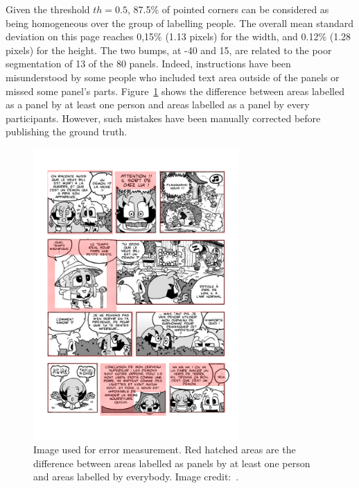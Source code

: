 Given the threshold $th=0.5$, 87.5\% of pointed corners can be considered as being homogeneous over the group of labelling people. 
The overall mean standard deviation on this page reaches 0,15\%
 (1.13 pixels) for the width, and 0.12\% (1.28 pixels) for the height.
The two bumps, at -40 and 15, are related to the poor segmentation of 13 of the 80 panels. 
Indeed, instructions have been misunderstood by some people who included text area outside of the panels or missed some panel's parts.
Figure~\ref{fig:gt:diffVT} shows the difference between areas labelled as a panel by at least one person and areas labelled as a panel by every participants.
However, such mistakes have been manually corrected before publishing the ground truth.

\begin{figure}[h!]
\begin{center}
\includegraphics[width=0.7\textwidth]{segDifference.png}
\caption[Image used for ground truth quality assessment]{Image used for error measurement. Red hatched areas are the difference between areas labelled as panels by at least one person and areas labelled by everybody. Image credit:~\cite{Bubble09}.}
\label{fig:gt:diffVT}
\end{center}
\end{figure}

